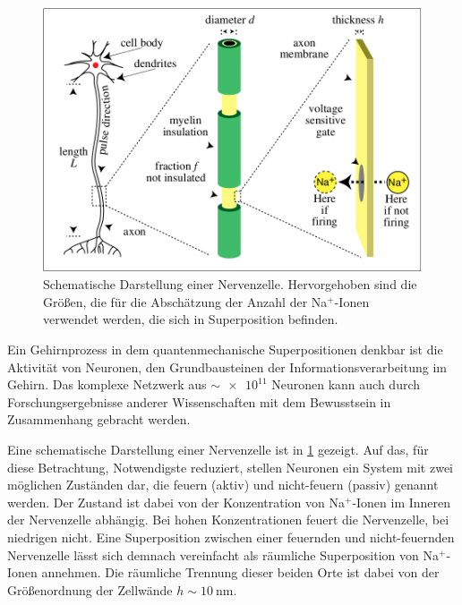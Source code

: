 


\begin{figure}
	\centering
	\includegraphics[scale=0.2]{graphics/neuron_schematic.jpg}
	\caption{Schematische Darstellung einer Nervenzelle. Hervorgehoben sind die Größen, die für die Abschätzung der 
		Anzahl der Na$^{+}$-Ionen verwendet werden, die sich in Superposition befinden.\cite{Tegmark_99} \label{fig:neuron}}
\end{figure}
Ein Gehirnprozess in dem quantenmechanische Superpositionen denkbar ist
die Aktivität von Neuronen, den Grundbausteinen der Informationsverarbeitung im 
Gehirn. Das komplexe Netzwerk aus $\sim \num{e11}$ Neuronen kann auch durch
Forschungsergebnisse anderer Wissenschaften mit dem Bewusstsein in Zusammenhang
gebracht werden.\,\cite{Koch_16}

Eine schematische Darstellung einer Nervenzelle ist in \cref{fig:neuron} gezeigt.
Auf das, für diese Betrachtung, Notwendigste reduziert, stellen Neuronen
ein System mit zwei möglichen Zuständen dar, die feuern (aktiv) und 
nicht-feuern (passiv) genannt werden. Der Zustand ist dabei von der Konzentration
von Na$^{+}$-Ionen im Inneren der Nervenzelle abhängig. Bei hohen Konzentrationen
feuert die Nervenzelle, bei niedrigen nicht. Eine Superposition zwischen einer 
feuernden und nicht-feuernden Nervenzelle lässt sich demnach vereinfacht als räumliche 
Superposition von Na$^{+}$-Ionen annehmen. Die räumliche Trennung dieser beiden Orte 
ist dabei von der Größenordnung der Zellwände $h \sim \SI{10}{\nano\meter}$.

